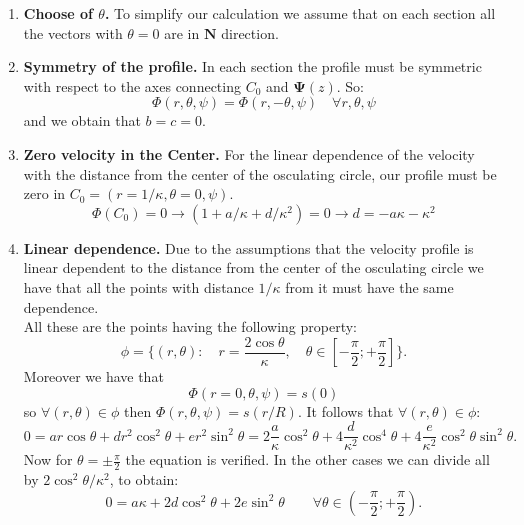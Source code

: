 \documentclass[a4paper]{report}
\begin{document}
	\begin{enumerate}	
	\item \textbf{Choose of $\theta$.} To simplify our calculation we assume that on each section all the vectors with $\theta=0$ are in $\mathbf{N}$ direction.
	\item \textbf{Symmetry of the profile.} In each section the profile must be symmetric with respect to the axes connecting $C_0 $ and $\boldsymbol{\Psi}(z)$. So:
	\begin{equation*}
		\Phi (r,\theta, \psi)= \Phi(r, -\theta, \psi) \quad \forall r,\theta,\psi
	\end{equation*}
and we obtain that $b=c=0$.
	\item\textbf{Zero velocity in the Center.} For the linear dependence of the velocity with the distance from the center of the osculating circle, our profile must be zero in $C_0 = (r=1/\kappa, \theta=0, \psi).$
	\begin{equation*}
	\Phi (C_0)= 0 \rightarrow (1+a/\kappa+d/\kappa^2)=0 	\rightarrow d=-a\kappa - \kappa^2
	\end{equation*}
	\item \textbf{Linear dependence.} Due to the assumptions that the velocity profile is linear dependent to the distance from the center of the osculating circle we have that all the points with distance $1/\kappa$ from it must have the same dependence.\\
All these are the points having the following property:
\begin{equation*}
\phi=\{(r,\theta): \quad r= \frac{2 \cos \theta}{\kappa}, \quad \theta \in [-\frac{\pi}{2}; +\frac{\pi}{2}] \}.
\end{equation*}
Moreover we have that
\begin{equation*}
\Phi(r=0,\theta,\psi)= s(0)
\end{equation*}
so $\forall (r,\theta) \in \phi$ then $\Phi(r,\theta, \psi)= s(r/R)$. It follows that $\forall (r,\theta) \in \phi$:
\begin{equation*}
0 = a r \cos \theta + d r^2 \cos^2 \theta + e r^2  \sin^2 \theta = 2 \frac{a}{\kappa} \cos^2 \theta + 4 \frac{d}{\kappa^2} \cos^4 \theta + 4 \frac{e}{\kappa^2} \cos^2 \theta \sin^2 \theta .
\end{equation*}
Now for $\theta=\pm \frac{\pi}{2}$ the equation is verified. In the other cases we can divide all by $2 \cos^2 \theta / \kappa^2$, to obtain:
\begin{equation*}
0= a \kappa + 2 d \cos^2 \theta + 2 e \sin^2 \theta \quad \quad \forall 	\theta  \in (-\frac{\pi}{2};+\frac{\pi}{2}).

\end{equation*}
\end{enumerate}
\end{document}
